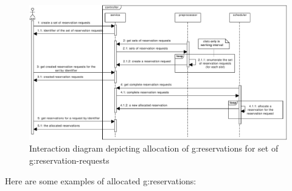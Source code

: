 \begin{figure}[ht!]
\includegraphics[width=\textwidth]{diagrams/sd_reservation_request_set_allocation}
\caption{Interaction diagram depicting allocation of \glspl{g:reservation} for set of \glspl{g:reservation-request}}
\label{fig:sd_reservation_request_set_allocation}
\end{figure}

\clearpage

Here are some examples of allocated \glspl{g:reservation}:

